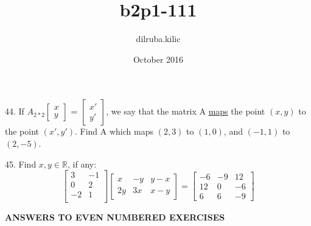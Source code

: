 \documentclass{article}
\title{b2p1-111}
\author{dilruba.kilic }
\date{October 2016}
\begin{document}
\begin{enumerate*}

    \item[44.] 
    If $ A_{2*2} 
    \begin{bmatrix}
        x \\
        y
    \end{bmatrix}$
=
    $
    \begin{bmatrix}
        x' \\
        y'
    \end{bmatrix}$,
    we say that the matrix A \underline{maps} the
    point $(x,y)$ to the point $(x',y')$. Find A which maps $(2,3)$
    to $(1,0)$, and $(-1,1)$ to $(2,-5)$.
    
    \medskip
    \item[45.] Find $x, y\in \mathbb{R}$, if any:
    $$
    \begin{bmatrix}
        3 & -1 \\
        0 & 2 \\
        -2 & 1 \\
    \end{bmatrix}
    \begin{bmatrix}
        x & -y & y-x \\
        2y & 3x & x-y
    \end{bmatrix}
    =
    \begin{bmatrix}
        -6 & -9 & 12 \\
        12 & 0 & -6 \\
        6 & 6 & -9
    \end{bmatrix}
    $$
 
\end{enumerate*}
\bigskip
\begin{center}
\textbf{ANSWERS TO EVEN NUMBERED EXERCISES}
\end{center}
\end{document}
